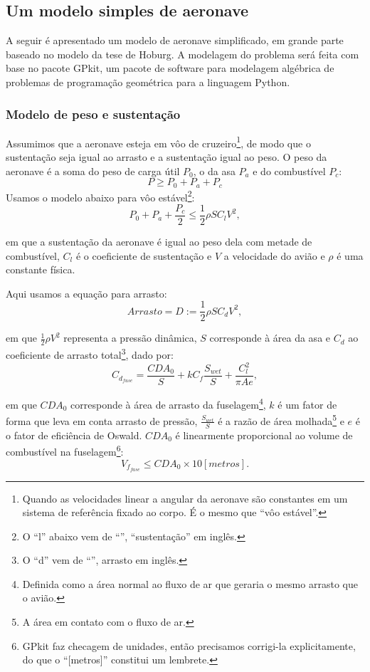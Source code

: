 \documentclass{article}
\begin{document}
\subsection{Um modelo simples de aeronave}


A seguir é apresentado um modelo de aeronave simplificado, em grande
parte baseado no modelo da tese de Hoburg\cite{hoburg}. A modelagem do
problema será feita com base no pacote GPkit\cite{gpkit}, um
pacote de software para modelagem algébrica de problemas de
programação geométrica para a linguagem Python.

\subsubsection{Modelo de peso e sustentação}

Assumimos que a aeronave esteja em vôo de cruzeiro\footnote{Quando as
  velocidades linear a angular da aeronave são constantes em um
  sistema de referência fixado ao corpo. É o mesmo que ``vôo
  estável''.}, de modo que o sustentação seja igual ao arrasto e a
sustentação igual ao peso. O peso da aeronave é a soma do peso de
carga útil $P_0$, o da asa $P_a$ e do combustível $P_c$:
\[
P \geq P_0 + P_a + P_c
\]
Usamos o modelo abaixo para vôo estável\footnote{O ``l'' abaixo vem de
  ``'', ``sustentação'' em inglês.}:
\[
  P_0 + P_a + \frac{P_c}{2} \leq \frac{1}{2} \rho S C_l V^2,
\]

\noindent em que a sustentação da aeronave é igual ao peso dela com
metade de combustível, $C_l$ é o coeficiente de sustentação e $V$ a
velocidade do avião e $\rho$ é uma constante física.

Aqui usamos a equação para arrasto:
\[
  Arrasto = D := \frac{1}{2} \rho S C_d V^2,
\]

\noindent em que $\frac{1}{2}\rho V^2$ representa a pressão dinâmica,
$S$ corresponde à área da asa e $C_d$ ao coeficiente de arrasto
total\footnote{O ``d'' vem de ``'', arrasto em inglês.},
dado por:
\[
  C_{d_{fuse}} = \frac{CDA_0}{S} + kC_f \frac{S_{wet}}{S} +
  \frac{C_{l}^2}{\pi A e},
\]

\noindent em que $CDA_0$ corresponde à área de arrasto da
fuselagem\footnote{Definida como a área normal ao fluxo de ar que
  geraria o mesmo arrasto que o avião.}, $k$ é um fator de forma que
leva em conta arrasto de pressão, $\frac{S_{wet}}{S}$ é a razão de
área molhada\footnote{A área em contato com o fluxo de ar.} e $e$ é o
fator de eficiência de Oswald. $CDA_0$ é linearmente proporcional ao
volume de combustível na fuselagem\footnote{GPkit faz checagem de
  unidades, então precisamos corrigi-la explicitamente, do que o
  ``[metros]'' constitui um lembrete.}:
\[
  V_{f_{fase}} \leq CDA_0 \times 10 [metros].
\]
\end{document}
